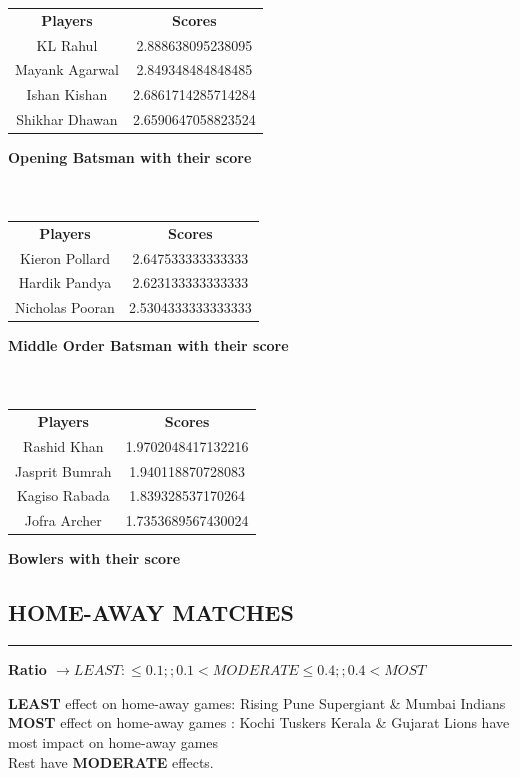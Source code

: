 \documentclass[12pt]{article}
\begin{document}
\begin{tabular}{c | c}
	\textbf{Players} & \textbf{Scores}\\
	KL Rahul & 2.888638095238095\\
	Mayank Agarwal & 2.849348484848485\\
	Ishan Kishan & 2.6861714285714284\\
	Shikhar Dhawan & 2.6590647058823524\\
\end{tabular} \hspace*{50pt} \textbf{Opening Batsman with their score}\\
\\\\
\begin{tabular}{c | c}
	\textbf{Players} & \textbf{Scores}\\
	Kieron Pollard & 2.647533333333333\\
	Hardik Pandya & 2.623133333333333\\
	Nicholas Pooran & 2.5304333333333333\\
\end{tabular} \hspace*{30pt} \textbf{Middle Order Batsman with their score}\\
\\\\
\begin{tabular}{c | c}
	\textbf{Players} & \textbf{Scores}\\
	Rashid Khan & 1.9702048417132216\\
	Jasprit Bumrah & 1.940118870728083\\
	Kagiso Rabada & 1.839328537170264\\
	Jofra Archer & 1.7353689567430024\\
\end{tabular} \hspace*{60pt} \textbf{Bowlers with their score}\\


\subsection*{HOME-AWAY MATCHES}
\hrule
\vspace*{15pt}
\textbf{Ratio $\rightarrow LEAST: \leq 0.1 ;;  0.1 < MODERATE \leq 0.4 ;;  0.4 < MOST$}

\textbf{LEAST} effect on home-away games: Rising Pune Supergiant \& Mumbai Indians\\
\textbf{MOST} effect on home-away games : Kochi Tuskers Kerala \& Gujarat Lions have most impact on home-away games\\
Rest have \textbf{MODERATE} effects.
\end{document}
